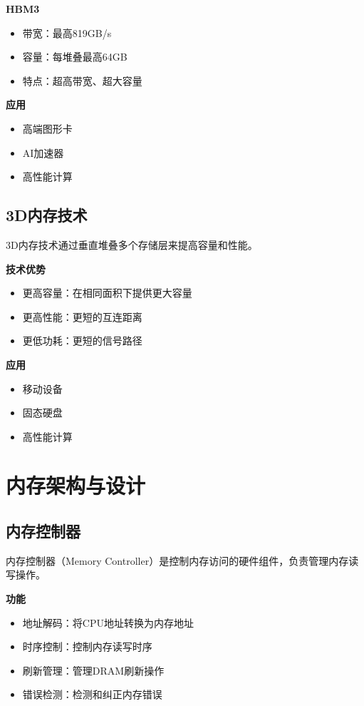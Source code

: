 \documentclass{article}
\begin{document}
\textbf{HBM3}

\begin{itemize}
    \item 带宽：最高819GB/s
    \item 容量：每堆叠最高64GB
    \item 特点：超高带宽、超大容量
\end{itemize}

\textbf{应用}
\begin{itemize}
    \item 高端图形卡
    \item AI加速器
    \item 高性能计算
\end{itemize}

\subsection{3D内存技术}

3D内存技术通过垂直堆叠多个存储层来提高容量和性能。

\textbf{技术优势}
\begin{itemize}
    \item 更高容量：在相同面积下提供更大容量
    \item 更高性能：更短的互连距离
    \item 更低功耗：更短的信号路径
\end{itemize}

\textbf{应用}
\begin{itemize}
    \item 移动设备
    \item 固态硬盘
    \item 高性能计算
\end{itemize}

\section{内存架构与设计}

\subsection{内存控制器}

内存控制器（Memory Controller）是控制内存访问的硬件组件，负责管理内存读写操作。

\textbf{功能}
\begin{itemize}
    \item 地址解码：将CPU地址转换为内存地址
    \item 时序控制：控制内存读写时序
    \item 刷新管理：管理DRAM刷新操作
    \item 错误检测：检测和纠正内存错误
\end{itemize}
\end{document}
